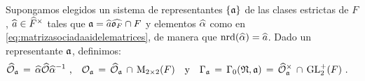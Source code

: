 %
Supongamos elegidos un sistema de representantes $\{\frak{a}\}$ de las clases
estrictas de $F$, $\hhat{a}\in\Idfin{F}$ tales que
$\frak{a}=\hhat{a}\Adfin{\oka{F}}\cap F$ y elementos $\hhat{\alpha}$ como en
\eqref{eq:matrizasociadaaidelematrices}, de manera que
$\nrd(\hhat{\alpha})=\hhat{a}$. Dado un representante $\frak{a}$, definimos:
\begin{align*}
	\Adfin{\cal{O}}_{\frak{a}}\,=\,
		\hhat{\alpha}\Adfin{\cal{O}}\hhat{\alpha}^{-1} & \text{ ,}\quad
	\cal{O}_{\frak{a}}\,=\,\Adfin{\cal{O}}_{\frak{a}}\,\cap\,
		\MM_{2\times 2}(F) \quad\text{y}\quad
	\Gamma_{\frak{a}} \,=\,\Gamma_{0}(\frak{N},\frak{a})
		\,=\,\Idfin{\cal{O}}_{\frak{a}}\,\cap\,\GLtp_{2}(F)
	\text{ .}
\end{align*}
%

